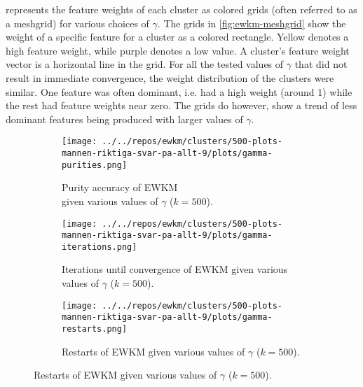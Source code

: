 \documentclass[../report.tex]{subfiles}
\begin{document}
 represents the feature weights of each cluster as colored grids (often referred to as a meshgrid) for various choices of $\gamma$. The grids in \cref{fig:ewkm-meshgrid} show the weight of a specific feature for a cluster as a colored rectangle. Yellow denotes a high feature weight, while purple denotes a low value. A cluster's feature weight vector is a horizontal line in the grid. For all the tested values of $\gamma$ that did not result in immediate convergence, the weight distribution of the clusters were similar. One feature was often dominant, i.e. had a high weight (around 1) while the rest had feature weights near zero. The grids do however, show a trend of less dominant features being produced with larger values of $\gamma$.

\newpage
\begin{figure}[H]
  \centering
  \begin{subfigure}{0.7\textwidth}
    \begin{center}
      \texttt{[image: ../../repos/ewkm/clusters/500-plots-mannen-riktiga-svar-pa-allt-9/plots/gamma-purities.png]}
      \caption{Purity accuracy of EWKM \\ given various values of $\gamma$ ($k=500$).}
      \label{fig:ewkm-purity}
    \end{center}
  \end{subfigure}
  \medskip
  \centering
  \begin{subfigure}{0.7\textwidth}
    \begin{center}
    \texttt{[image: ../../repos/ewkm/clusters/500-plots-mannen-riktiga-svar-pa-allt-9/plots/gamma-iterations.png]}
    \caption{Iterations until convergence of EWKM given various values of $\gamma$ ($k=500$).}
    \label{fig:ewkm-iterations}
    \end{center}
  \end{subfigure}
  \medskip
  \centering
  \begin{subfigure}{0.7\textwidth}
    \begin{center}
    \texttt{[image: ../../repos/ewkm/clusters/500-plots-mannen-riktiga-svar-pa-allt-9/plots/gamma-restarts.png]}
    \caption{Restarts of EWKM given various values of $\gamma$ ($k=500$).}
    \label{fig:ewkm-restarts}
    \end{center}
  \end{subfigure}
\end{figure}
\newpage
\end{document}
